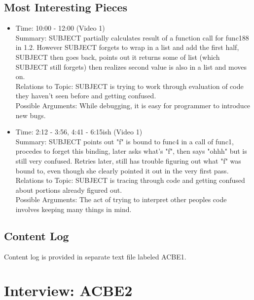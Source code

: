 \documentclass{article}
\begin{document}
\subsection{Most Interesting Pieces}
\begin{itemize}
  \item Time: 10:00 - 12:00 (Video 1) \\
  Summary: SUBJECT partially calculates result of a function call for func188 in 1.2.
However SUBJECT forgets to wrap in a list and add the first half, SUBJECT then goes back, points out it returns some of list (which SUBJECT still forgets) then realizes second value is also in a list and moves on. \\
  Relations to Topic: SUBJECT is trying to work through evaluation of code they haven't seen before and getting confused. \\
  Possible Arguments: While debugging, it is easy for programmer to introduce new bugs.
  \item Time: 2:12 - 3:56, 4:41 - 6:15ish (Video 1) \\
  Summary: SUBJECT points out "f" is bound to func4 in a call of func1, procedes to forget this binding, later asks what's "f", then says "ohhh" but is still very confused.
Retries later, still has trouble figuring out what "f" was bound to, even though she clearly pointed it out in the very first pass. \\
  Relations to Topic: SUBJECT is tracing through code and getting confused about portions already figured out. \\
  Possible Arguments: The act of trying to interpret other peoples code involves keeping many things in mind.
\end{itemize}
\subsection{Content Log}
Content log is provided in separate text file labeled ACBE1.

\newpage
\section{Interview: ACBE2}
\end{document}
